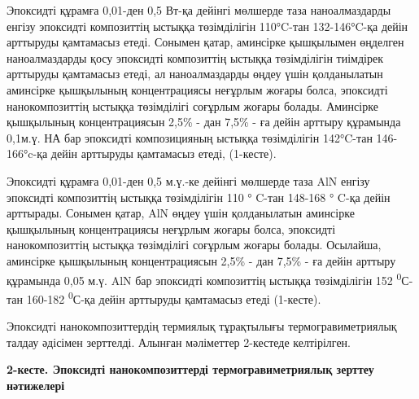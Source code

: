 \begin{multicols}{2}
Эпоксидті құрамға 0,01-ден 0,5 Вт-қа дейінгі мөлшерде таза
наноалмаздарды енгізу эпоксидті композиттің ыстыққа төзімділігін
110°C-тан 132-146°C-қа дейін арттыруды қамтамасыз етеді. Сонымен қатар,
аминсірке қышқылымен өңделген наноалмаздарды қосу эпоксидті композиттің
ыстыққа төзімділігін тиімдірек арттыруды қамтамасыз етеді, ал
наноалмаздарды өңдеу үшін қолданылатын аминсірке қышқылының
концентрациясы неғұрлым жоғары болса, эпоксидті нанокомпозиттің ыстыққа
төзімділігі соғұрлым жоғары болады. Аминсірке қышқылының концентрациясын
2,5\% - дан 7,5\% - ға дейін арттыру құрамында 0,1м.ү. НА бар эпоксидті
композицияның ыстыққа төзімділігін 142°C-тан 146-166°c-қа дейін
арттыруды қамтамасыз етеді, (1-кесте).

Эпоксидті құрамға 0,01-ден 0,5 м.ү.-ке дейінгі мөлшерде таза AlN енгізу
эпоксидті композиттің ыстыққа төзімділігін 110 ° C-тан 148-168 ° C-қа
дейін арттырады. Сонымен қатар, AlN өңдеу үшін қолданылатын аминсірке
қышқылының концентрациясы неғұрлым жоғары болса, эпоксидті
нанокомпозиттің ыстыққа төзімділігі соғұрлым жоғары болады. Осылайша,
аминсірке қышқылының концентрациясын 2,5\% - дан 7,5\% - ға дейін
арттыру құрамында 0,05 м.ү. AlN бар эпоксидті композиттің ыстыққа
төзімділігін 152 \textsuperscript{0}С-тан 160-182
\textsuperscript{0}С-қа дейін арттыруды қамтамасыз етеді (1-кесте).

Эпоксидті нанокомпозиттердің термиялық тұрақтылығы термогравиметриялық
талдау әдісімен зерттелді. Алынған мәліметтер 2-кестеде келтірілген.
\end{multicols}

{\bfseries 2-кесте. Эпоксидті нанокомпозиттерді термогравиметриялық зерттеу
нәтижелері}

